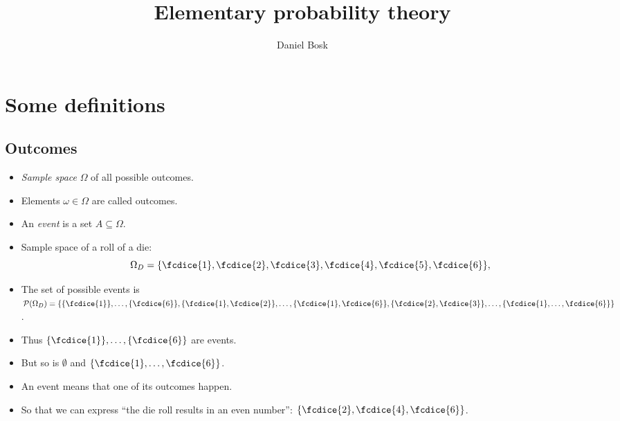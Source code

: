 \title{Elementary probability theory}
\author{Daniel Bosk}

\begin{frame}
\maketitle
\end{frame}

\mode*

\section{Some definitions}

\subsection{Outcomes}

\begin{frame}
  \begin{definition}[Outcome]
    \begin{itemize}
      \item \emph{Sample space} \(\Omega\) of all possible outcomes.
      \item Elements \(\omega\in \Omega\) are called outcomes.
      \item An \emph{event} is a set \(A\subseteq \Omega\).
    \end{itemize}
  \end{definition}
\end{frame}

\begin{frame}
  \begin{example}
    \begin{itemize}
      \item Sample space of a roll of a die: \[\Omega_D = \{\fcdice{1}, 
          \fcdice{2}, \fcdice{3}, \fcdice{4}, \fcdice{5}, \fcdice{6}\},\]
        
        \pause{}

      \item The set of possible events is \(\powerset(\Omega_D) 
          = \{\{\fcdice{1}\}, \ldots, \{\fcdice{6}\}, \{\fcdice{1}, 
          \fcdice{2}\}, \ldots, \{\fcdice{1}, \fcdice{6}\}, 
          \{\fcdice{2},\fcdice{3}\}, \ldots, 
          \{\fcdice{1},\ldots,\fcdice{6}\}\}\).
      \item Thus \(\{\fcdice{1}\},\ldots,\{\fcdice{6}\}\) are events.
      \item But so is \(\emptyset\) and \(\{\fcdice{1}, \ldots, \fcdice{6}\}\).

        \pause{}

      \item An event means that one of its outcomes happen.
      \item So that we can express \enquote{the die roll results in an even 
          number}: \(\{\fcdice{2}, \fcdice{4}, \fcdice{6}\}\).
    \end{itemize}
  \end{example}
\end{frame}

